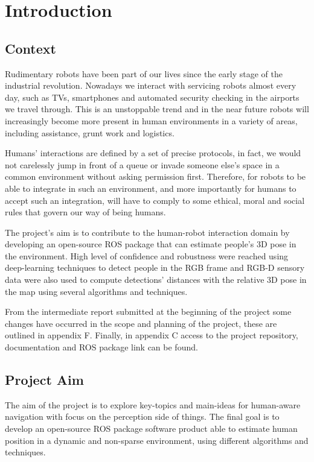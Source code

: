 \chapter{Introduction}
\label{chapter1}

\section{Context}

Rudimentary robots have been part of our lives since the early stage of the industrial revolution. Nowadays we interact with servicing robots almost every day, such as TVs, smartphones and automated security checking in the airports we travel through. This is an unstoppable trend and in the near future robots will increasingly become more present in human environments in a variety of areas, including assistance, grunt work and logistics.

Humans' interactions are defined by a set of precise protocols, in fact, we would not carelessly jump in front of a queue or invade someone else's space in a common environment without asking permission first. Therefore, for robots to be able to integrate in such an environment, and more importantly for humans to accept such an integration, will have to comply to some ethical, moral and social rules that govern our way of being humans.

The project's aim is to contribute to the human-robot interaction domain by developing an open-source ROS package that can estimate people’s 3D pose in the environment. High level of confidence and robustness were reached using deep-learning techniques to detect people in the RGB frame and RGB-D sensory data were also used to compute detections' distances with the relative 3D pose in the map using several algorithms and techniques.

From the intermediate report submitted at the beginning of the project some changes have occurred in the scope and planning of the project, these are outlined in appendix F. Finally, in appendix C access to the project repository, documentation and ROS package link can be found.

\section{Project Aim}

The aim of the project is to explore key-topics and main-ideas for human-aware navigation with focus on the perception side of things. The final goal is to develop an open-source ROS package software product able to estimate human position in a dynamic and non-sparse environment, using different algorithms and techniques.

